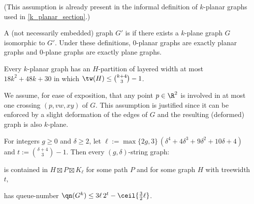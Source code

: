  (This assumption is already present in the informal definition of $k$-planar graphs used in \cref{k_planar_section}.)

   A (not necessarily embedded) graph $G'$ is  if there exists a $k$-plane graph $G$ isomorphic to $G'$. Under these definitions, $0$-planar graphs are exactly planar graphs and $0$-plane graphs are exactly plane graphs.


\begin{thm}
\label{k-planar}
Every $k$-planar graph has an $H$-partition of layered width at most $18k^2 + 48k+30$ in which $\tw(H)\leq \binom{k+4}{3}-1$.
\end{thm}

 We assume, for ease of exposition, that any point $p\in\R^2$ is involved in at most one crossing $(p,vw,xy)$ of $G$. This assumption is justified since it can be enforced by a slight deformation of the edges of $G$ and the resulting (deformed) graph is also $k$-plane.



 \begin{thm}
 \label{StringPartition}
 For integers $g\geq 0$ and $\delta\geq 2$, let $\ell:= \max\{2g,3\} \,(\delta^4 + 4 \delta^3 + 9 \delta^2 + 10 \delta + 4)$ and $t:= \binom{ \delta+4}{3}-1$.
 Then  every $(g,\delta)$-string graph:
 \begin{compactitem}
 	\item is contained in $H\boxtimes P \boxtimes K_{\ell}$ for some path $P$ and for some graph $H$ with treewidth $t$,
 	\item has queue-number $\qn(G^k) \leq 3 \ell \, 2^t - \ceil{\tfrac{3}{2}\ell}$.
 \end{compactitem}
 \end{thm}

